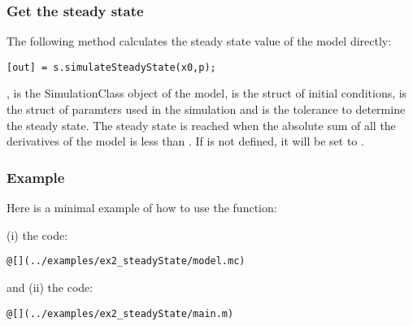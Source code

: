 \documentclass[11pt]{article}
\begin{document}
\subsubsection{Get the steady state}

The following method calculates the steady state value of the model directly:

\begin{lstlisting}
[out] = s.simulateSteadyState(x0,p);
\end{lstlisting}

,  is the SimulationClass object of the model,  is the struct of initial conditions,  is the struct of paramters used in the simulation and  is the tolerance to determine the steady state. The steady state is reached when the absolute sum of all the derivatives of the model is less than . If  is not defined, it will be set to .

\subsubsection{Example}

Here is a minimal example of how to use the  function:

(i) the  code:

\begin{lstlisting}
@[](../examples/ex2_steadyState/model.mc)
\end{lstlisting}

and (ii) the  code:

\begin{lstlisting}
@[](../examples/ex2_steadyState/main.m)
\end{lstlisting}
\end{document}
